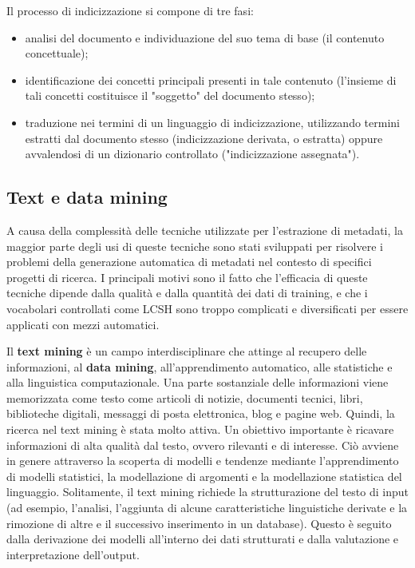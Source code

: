 Il processo di indicizzazione si compone di tre fasi:
\begin{itemize}
\item analisi del documento e individuazione del suo tema di base (il contenuto concettuale);
\item identificazione dei concetti principali presenti in tale contenuto (l'insieme di tali concetti costituisce il "soggetto" del documento stesso);
\item traduzione nei termini di un linguaggio di indicizzazione, utilizzando termini estratti dal documento stesso (indicizzazione derivata, o estratta) oppure avvalendosi di un dizionario controllato ("indicizzazione assegnata").
\end{itemize}

\subsection{Text e data mining}
A causa della complessità delle tecniche utilizzate per l'estrazione di metadati, la maggior parte degli usi di queste tecniche sono stati sviluppati per risolvere i problemi della generazione automatica di metadati nel contesto di specifici progetti di ricerca.
I principali motivi sono il fatto che l'efficacia di queste tecniche dipende dalla qualità e dalla quantità dei dati di training, e che i vocabolari controllati come LCSH sono troppo complicati e diversificati per essere applicati con mezzi automatici.

Il \textbf{text mining} è un campo interdisciplinare che attinge al recupero delle informazioni, al \textbf{data mining}, all'apprendimento automatico, alle statistiche e alla linguistica computazionale. Una parte sostanziale delle informazioni viene memorizzata come testo come articoli di notizie, documenti tecnici, libri, biblioteche digitali, messaggi di posta elettronica, blog e pagine web. Quindi, la ricerca nel text mining è stata molto attiva. Un obiettivo importante è ricavare informazioni di alta qualità dal testo, ovvero rilevanti e di interesse. Ciò avviene in genere attraverso la scoperta di modelli e tendenze mediante l'apprendimento di modelli statistici, la modellazione di argomenti e la modellazione statistica del linguaggio. Solitamente, il text mining richiede la strutturazione del testo di input (ad esempio, l'analisi, l'aggiunta di alcune caratteristiche linguistiche derivate e la rimozione di altre e il successivo inserimento in un database). Questo è seguito dalla derivazione dei modelli all'interno dei dati strutturati e dalla valutazione e interpretazione dell'output.

